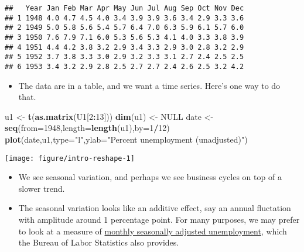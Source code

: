 \documentclass[]{article}
\newenvironment{Shaded}{\begin{snugshade}}{\end{snugshade}}
\newcommand{\KeywordTok}[1]{\textcolor[rgb]{0.13,0.29,0.53}{\textbf{#1}}}
\newcommand{\DataTypeTok}[1]{\textcolor[rgb]{0.13,0.29,0.53}{#1}}
\newcommand{\DecValTok}[1]{\textcolor[rgb]{0.00,0.00,0.81}{#1}}
\newcommand{\StringTok}[1]{\textcolor[rgb]{0.31,0.60,0.02}{#1}}
\newcommand{\OtherTok}[1]{\textcolor[rgb]{0.56,0.35,0.01}{#1}}
\newcommand{\OperatorTok}[1]{\textcolor[rgb]{0.81,0.36,0.00}{\textbf{#1}}}
\newcommand{\NormalTok}[1]{#1}
\providecommand{\tightlist}{%
  \setlength{\itemsep}{0pt}\setlength{\parskip}{0pt}}
\begin{document}
\begin{verbatim}
##   Year Jan Feb Mar Apr May Jun Jul Aug Sep Oct Nov Dec
## 1 1948 4.0 4.7 4.5 4.0 3.4 3.9 3.9 3.6 3.4 2.9 3.3 3.6
## 2 1949 5.0 5.8 5.6 5.4 5.7 6.4 7.0 6.3 5.9 6.1 5.7 6.0
## 3 1950 7.6 7.9 7.1 6.0 5.3 5.6 5.3 4.1 4.0 3.3 3.8 3.9
## 4 1951 4.4 4.2 3.8 3.2 2.9 3.4 3.3 2.9 3.0 2.8 3.2 2.9
## 5 1952 3.7 3.8 3.3 3.0 2.9 3.2 3.3 3.1 2.7 2.4 2.5 2.5
## 6 1953 3.4 3.2 2.9 2.8 2.5 2.7 2.7 2.4 2.6 2.5 3.2 4.2
\end{verbatim}

\begin{itemize}
\tightlist
\item
  The data are in a table, and we want a time series. Here's one way to
  do that.
\end{itemize}

\begin{Shaded}
\begin{Highlighting}[]
\NormalTok{u1 <-}\StringTok{ }\KeywordTok{t}\NormalTok{(}\KeywordTok{as.matrix}\NormalTok{(U1[}\DecValTok{2}\OperatorTok{:}\DecValTok{13}\NormalTok{]))}
\KeywordTok{dim}\NormalTok{(u1) <-}\StringTok{ }\OtherTok{NULL}
\NormalTok{date <-}\StringTok{ }\KeywordTok{seq}\NormalTok{(}\DataTypeTok{from=}\DecValTok{1948}\NormalTok{,}\DataTypeTok{length=}\KeywordTok{length}\NormalTok{(u1),}\DataTypeTok{by=}\DecValTok{1}\OperatorTok{/}\DecValTok{12}\NormalTok{)}
\KeywordTok{plot}\NormalTok{(date,u1,}\DataTypeTok{type=}\StringTok{"l"}\NormalTok{,}\DataTypeTok{ylab=}\StringTok{"Percent unemployment (unadjusted)"}\NormalTok{)}
\end{Highlighting}
\end{Shaded}

\begin{center}\texttt{[image: figure/intro-reshape-1]} \end{center}

\begin{itemize}
\item
  We see seasonal variation, and perhaps we see business cycles on top
  of a slower trend.
\item
  The seasonal variation looks like an additive effect, say an annual
  fluctation with amplitude around 1 percentage point. For many
  purposes, we may prefer to look at a measure of
  \href{http://data.bls.gov/timeseries/LNS14000000}{monthly seasonally
  adjusted unemployment}, which the Bureau of Labor Statistics also
  provides.
\end{itemize}
\end{document}
